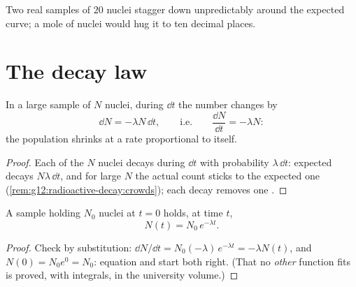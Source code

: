 \begin{omfigure}

{\small Two real samples of $20$ nuclei stagger down unpredictably around
the expected curve; a mole of nuclei would hug it to ten decimal places.}
\end{omfigure}

\section{The decay law}

\begin{proposition}\label{prop:g12:radioactive-decay:ode}
In a large sample of $N$ nuclei, during $\dd t$ the number changes by
\[
\dd N = -\lambda N\,\dd t, \qquad\text{i.e.}\qquad \frac{\dd N}{\dd t} = -\lambda N :
\]
the population shrinks at a rate proportional to itself.
\end{proposition}

\begin{proof}
Each of the $N$ nuclei decays during $\dd t$ with probability
$\lambda\,\dd t$: expected decays $N\lambda\,\dd t$, and for large $N$ the
actual count sticks to the expected one
(\cref{rem:g12:radioactive-decay:crowds}); each decay removes one .
\end{proof}

\begin{theorem}\label{thm:g12:radioactive-decay:law}
A sample holding $N_0$ nuclei at $t = 0$ holds, at time $t$,
\[
N(t) = N_0 \, e^{-\lambda t}.
\]
\end{theorem}

\begin{proof}
Check by substitution:
$\dd N/\dd t = N_0(-\lambda)\,e^{-\lambda t} = -\lambda N(t)$, and
$N(0) = N_0 e^0 = N_0$: equation and start both right. (That no
\emph{other} function fits is proved, with integrals, in the university
volume.)
\end{proof}

